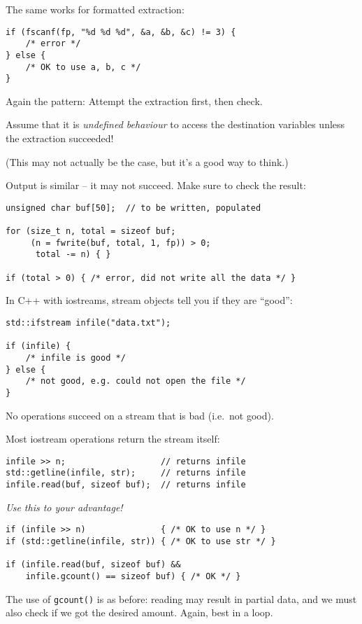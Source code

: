 \documentclass[landscape,a4paper]{article}
\newenvironment{vcframe}{%
\begin{titlepage}
\vspace*{\fill}}{%
\vspace*{\parskip}%
\vspace*{\fill}
\end{titlepage}}
\begin{document}
\begin{vcframe}
\setlength{\parskip}{1\baselineskip}
The same works for formatted extraction:
{\small\begin{verbatim}
if (fscanf(fp, "%d %d %d", &a, &b, &c) != 3) {
    /* error */
} else {
    /* OK to use a, b, c */
}
\end{verbatim}}
Again the pattern: Attempt the extraction first, then check.

Assume that it is \emph{undefined behaviour} to access the destination
variables unless the extraction succeeded!

(This may not actually be the case, but it's a good way to think.)
\end{vcframe}

\begin{vcframe}
\setlength{\parskip}{1\baselineskip}
Output is similar -- it may not succeed. Make sure to check the result:
{\small\begin{verbatim}
unsigned char buf[50];  // to be written, populated

for (size_t n, total = sizeof buf;
     (n = fwrite(buf, total, 1, fp)) > 0;
      total -= n) { }

if (total > 0) { /* error, did not write all the data */ }
\end{verbatim}}
\end{vcframe}

\begin{vcframe}
\setlength{\parskip}{1\baselineskip}
In C++ with iostreams, stream objects tell you if they are ``good'':
{\small\begin{verbatim}
std::ifstream infile("data.txt");

if (infile) {
    /* infile is good */
} else {
    /* not good, e.g. could not open the file */
}
\end{verbatim}}
No operations succeed on a stream that is bad (i.e.\ not good).
\end{vcframe}

\begin{vcframe}
\setlength{\parskip}{1\baselineskip}
Most iostream operations return the stream itself:
{\small\begin{verbatim}
infile >> n;                   // returns infile
std::getline(infile, str);     // returns infile
infile.read(buf, sizeof buf);  // returns infile
\end{verbatim}}

\emph{Use this to your advantage!}
{\small\begin{verbatim}
if (infile >> n)               { /* OK to use n */ }
if (std::getline(infile, str)) { /* OK to use str */ }

if (infile.read(buf, sizeof buf) &&
    infile.gcount() == sizeof buf) { /* OK */ }
\end{verbatim}}
The use of \texttt{gcount()} is as before: reading may result in partial data, and
we must also check if we got the desired amount. Again, best in a loop.
\end{vcframe}
\end{document}
